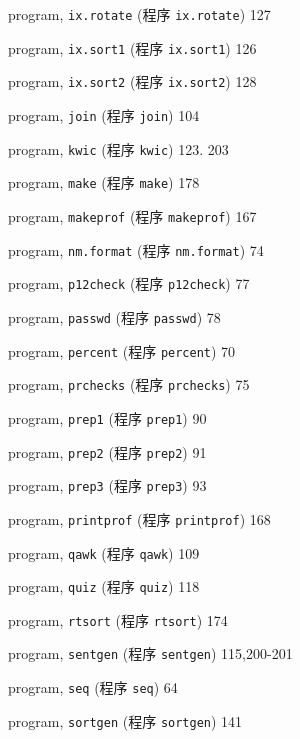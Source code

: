 \begin{multicols}{3}
\hangindent=3pc  program, \verb'ix.rotate' (程序 \verb'ix.rotate')
127

\hangindent=3pc  program, \verb'ix.sort1' (程序 \verb'ix.sort1') 126

\hangindent=3pc  program, \verb'ix.sort2' (程序 \verb'ix.sort2') 128

\hangindent=3pc  program, \verb'join' (程序 \verb'join') 104

\hangindent=3pc  program, \verb'kwic' (程序 \verb'kwic') 123. 203

\hangindent=3pc  program, \verb'make' (程序 \verb'make') 178

\hangindent=3pc  program, \verb'makeprof' (程序 \verb'makeprof') 167

\hangindent=3pc  program, \verb'nm.format' (程序 \verb'nm.format')
74

\hangindent=3pc  program, \verb'p12check' (程序 \verb'p12check') 77

\hangindent=3pc  program, \verb'passwd' (程序 \verb'passwd') 78

\hangindent=3pc  program, \verb'percent' (程序 \verb'percent') 70

\hangindent=3pc  program, \verb'prchecks' (程序 \verb'prchecks') 75

\hangindent=3pc  program, \verb'prep1' (程序 \verb'prep1') 90

\hangindent=3pc  program, \verb'prep2' (程序 \verb'prep2') 91

\hangindent=3pc  program, \verb'prep3' (程序 \verb'prep3') 93

\hangindent=3pc  program, \verb'printprof' (程序
\verb'printprof') 168

\hangindent=3pc  program, \verb'qawk' (程序 \verb'qawk') 109

\hangindent=3pc  program, \verb'quiz'  (程序 \verb'quiz') 118

\hangindent=3pc  program, \verb'rtsort'  (程序 \verb'rtsort') 174

\hangindent=3pc  program, \verb'sentgen'  (程序 \verb'sentgen')
115,200-201

\hangindent=3pc  program, \verb'seq'  (程序 \verb'seq') 64

\hangindent=3pc  program, \verb'sortgen'  (程序 \verb'sortgen') 141


\end{multicols}
